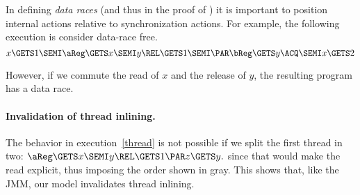 In defining \emph{data races} (and thus in the proof of \drfsc) it is
important to position internal actions relative to synchronization actions.
For example, the following execution is consider data-race free.
\begin{displaymath}
  x\GETS1\SEMI
  \aReg\GETS x \SEMI
  y\REL\GETS 1 \SEMI
  \PAR
  \bReg\GETS y\ACQ \SEMI
  x\GETS 2
\end{displaymath}
\begin{tikzdisplay}[node distance=1em]
\end{tikzdisplay}
However, if we commute the read of $x$ and the release of $y$, the resulting
program has a data race.

\paragraph*{Invalidation of thread inlining.}
The behavior in execution~\eqref{thread} is not possible if we split the first
thread in two:
\begin{math}
  \aReg\GETS x\SEMI
  y\REL\GETS 1\PAR
  z\GETS y.
\end{math}
since that would make the read explicit, thus imposing the order
shown in gray.   This shows that, like the JMM, our model invalidates thread
inlining.

